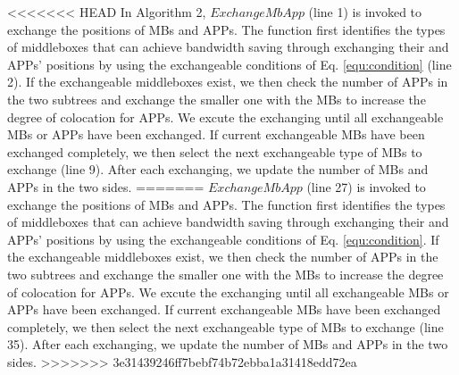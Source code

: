 \documentclass[review]{elsarticle}
\begin{document}
<<<<<<< HEAD
In Algorithm 2, $ExchangeMbApp$ (line 1) is invoked to exchange the positions of MBs and APPs. The function first identifies the types of middleboxes that can achieve bandwidth saving through exchanging their and APPs’ positions by using the exchangeable conditions of Eq. \ref{equ:condition} (line 2). If the exchangeable middleboxes exist, we then check the number of APPs in the two subtrees and exchange the smaller one with the MBs to increase the degree of colocation for APPs. We excute the exchanging until all exchangeable MBs or APPs have been exchanged. If current exchangeable MBs have been exchanged completely, we then select the next exchangeable type of MBs to exchange (line 9). After each exchanging, we update the number of MBs and APPs in the two sides.
=======
$ExchangeMbApp$ (line 27) is invoked to exchange the positions of MBs and APPs. The function first identifies the types of middleboxes that can achieve bandwidth saving through exchanging their and APPs’ positions by using the exchangeable conditions of Eq. \ref{equ:condition}. If the exchangeable middleboxes exist, we then check the number of APPs in the two subtrees and exchange the smaller one with the MBs to increase the degree of colocation for APPs. We excute the exchanging until all exchangeable MBs or APPs have been exchanged. If current exchangeable MBs have been exchanged completely, we then select the next exchangeable type of MBs to exchange (line 35). After each exchanging, we update the number of MBs and APPs in the two sides.
>>>>>>> 3e31439246ff7bebf74b72ebba1a31418edd72ea
\end{document}
